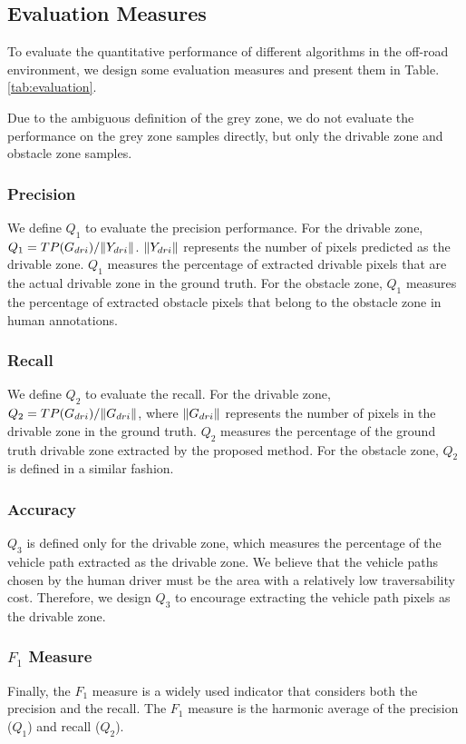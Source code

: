 \documentclass[letterpaper, 10 pt, conference]{ieeeconf}  %
\begin{document}
\subsection{Evaluation Measures}	\label{sec:eval}

To evaluate the quantitative performance of different algorithms in the off-road environment, we design some evaluation measures and present them in Table.\ref{tab:evaluation}. 

Due to the ambiguous definition of the grey zone, we do not evaluate the performance on the grey zone samples directly, but only the drivable zone and obstacle zone samples.

\subsubsection{Precision}
We define $Q_1$ to evaluate the precision performance. For the drivable zone, $Q_1={TP(G_{dri})}/{\Arrowvert Y_{dri} \Arrowvert}$. ${\Arrowvert Y_{dri} \Arrowvert}$ represents the number of pixels predicted as the drivable zone. $Q_1$ measures the percentage of extracted drivable pixels that are the actual drivable zone in the ground truth. For the obstacle zone, $Q_1$ measures the percentage of extracted obstacle pixels that belong to the obstacle zone in human annotations.
\subsubsection{Recall}
We define $Q_2$ to evaluate the recall. For the drivable zone, $Q_2={TP(G_{dri})}/{\Arrowvert G_{dri} \Arrowvert}$, where ${\Arrowvert G_{dri} \Arrowvert}$ represents the number of pixels in the drivable zone in the ground truth. $Q_2$ measures the percentage of the ground truth drivable zone extracted by the proposed method. For the obstacle zone, $Q_2$ is defined in a similar fashion.
\subsubsection{Accuracy}
$Q_3$ is defined only for the drivable zone, which measures the percentage of the vehicle path extracted as the drivable zone. We believe that the vehicle paths chosen by the human driver must be the area with a relatively low traversability cost. Therefore, we design $Q_3$ to encourage extracting the vehicle path pixels as the drivable zone.
\subsubsection{$F_1$ Measure}
Finally, the $F_1$ measure is a widely used indicator that considers both the precision and the recall. The $F_1$ measure is the harmonic average of the precision ($Q_1$) and recall ($Q_2$). 
\end{document}
